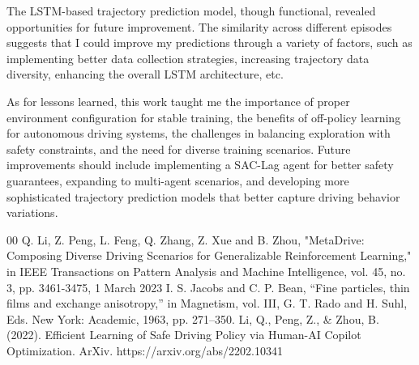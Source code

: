 \documentclass[10pt]{IEEEtran}
\begin{document}
The LSTM-based trajectory prediction model, though functional, revealed opportunities for future improvement. The similarity across different episodes suggests that I could improve my predictions through a variety of factors, such as implementing better data collection strategies, increasing trajectory data diversity, enhancing the overall LSTM architecture, etc.

As for lessons learned, this work taught me the importance of proper environment configuration for stable training, the benefits of off-policy learning for autonomous driving systems, the challenges in balancing exploration with safety constraints, and the need for diverse training scenarios. Future improvements should include implementing a SAC-Lag agent for better safety guarantees, expanding to multi-agent scenarios, and developing more sophisticated trajectory prediction models that better capture driving behavior variations.

\begin{thebibliography}{00}
 Q. Li, Z. Peng, L. Feng, Q. Zhang, Z. Xue and B. Zhou, "MetaDrive: Composing Diverse Driving Scenarios for Generalizable Reinforcement Learning," in IEEE Transactions on Pattern Analysis and Machine Intelligence, vol. 45, no. 3, pp. 3461-3475, 1 March 2023
 I. S. Jacobs and C. P. Bean, ``Fine particles, thin films and exchange anisotropy,'' in Magnetism, vol. III, G. T. Rado and H. Suhl, Eds. New York: Academic, 1963, pp. 271--350.
 Li, Q., Peng, Z., & Zhou, B. (2022). Efficient Learning of Safe Driving Policy via Human-AI Copilot Optimization. ArXiv. https://arxiv.org/abs/2202.10341
\end{thebibliography}
\end{document}
